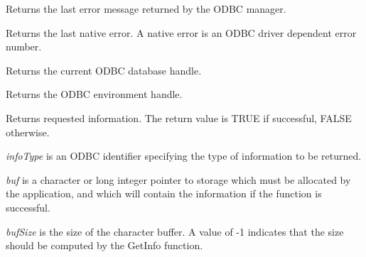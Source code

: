 \begin{twocollist}\itemsep=0pt
\end{twocollist}



Returns the last error message returned by the ODBC manager.



Returns the last native error. A native error is an ODBC driver dependent
error number.



Returns the current ODBC database handle.



Returns the ODBC environment handle. 




Returns requested information. The return value is TRUE if successful, FALSE otherwise.

{\it infoType} is an ODBC identifier specifying the type of information to be returned.

{\it buf} is a character or long integer pointer to storage which must be allocated by the
application, and which will contain the information if the function is successful.

{\it bufSize} is the size of the character buffer. A value of -1 indicates that the size
should be computed by the GetInfo function.


